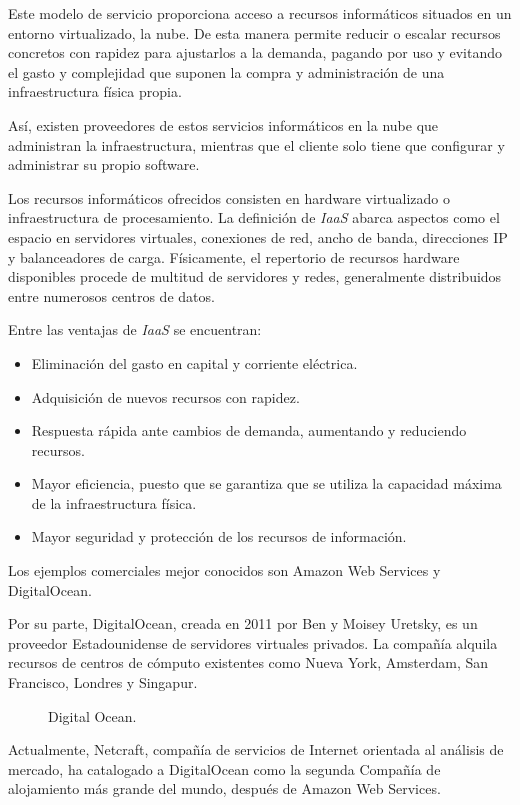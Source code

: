 Este modelo de servicio proporciona acceso a recursos informáticos situados en un entorno virtualizado, la nube. De esta manera permite reducir o escalar recursos  concretos con rapidez para ajustarlos a la demanda, pagando por uso y evitando el gasto y complejidad que suponen la compra y administración de una infraestructura física propia.

Así, existen proveedores de estos servicios informáticos en la nube que administran la infraestructura, mientras que el cliente solo tiene que configurar y administrar su propio software.

Los recursos informáticos ofrecidos consisten en hardware virtualizado o infraestructura de procesamiento. La definición de \textit{IaaS} abarca aspectos como el espacio en servidores virtuales, conexiones de red, ancho de banda, direcciones IP y balanceadores de carga. Físicamente, el repertorio de recursos hardware disponibles procede de multitud de servidores y redes, generalmente distribuidos entre numerosos centros de datos.

Entre las ventajas de \textit{IaaS} se encuentran:
\begin{itemize}
\item Eliminación del gasto en capital y corriente eléctrica.
\item Adquisición de nuevos recursos con rapidez.
\item Respuesta rápida ante cambios de demanda, aumentando y reduciendo recursos.
\item Mayor eficiencia, puesto que se garantiza que se utiliza la capacidad máxima de la infraestructura física.
\item Mayor seguridad y protección de los recursos de información.
\end{itemize}

Los ejemplos comerciales mejor conocidos son Amazon Web Services y DigitalOcean.

Por su parte, DigitalOcean, creada en 2011 por Ben y Moisey Uretsky, es un proveedor Estadounidense de servidores virtuales privados. La compañía alquila recursos de centros de cómputo existentes como Nueva York, Amsterdam, San Francisco, Londres y Singapur.

\begin{figure}[H]
\caption{Digital Ocean.\label{fig:figure_placement_example}}
\end{figure}

Actualmente, Netcraft, compañía de servicios de Internet orientada al análisis de mercado, ha catalogado a DigitalOcean como la segunda Compañía de alojamiento más grande del mundo, después de Amazon Web Services.

